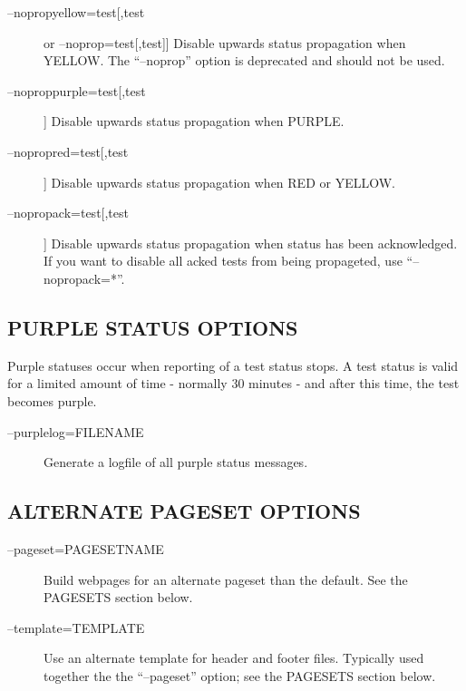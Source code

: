 \begin{description}

\item[--nopropyellow=test[,test] or --noprop=test[,test]] Disable
  upwards status propagation when YELLOW. The ``--noprop'' option is
  deprecated and should not be used. 
 

\item[--noproppurple=test[,test]] Disable upwards status propagation when PURPLE. 

 

\item[--nopropred=test[,test]] Disable upwards status propagation when RED or YELLOW. 

 

\item[--nopropack=test[,test]] Disable upwards status propagation when
  status has been acknowledged. If you want to disable all acked tests
  from being propageted, use ``--nopropack=*''. 


 


\end{description}

\subsection{PURPLE STATUS OPTIONS}
 Purple statuses occur when reporting of a test status stops. A test
 status is valid for a limited amount of time - normally 30 minutes -
 and after this time, the test becomes purple. 


 \begin{description}
\item[--purplelog=FILENAME] Generate a logfile of all purple status messages. 

 


\end{description}

\subsection{ALTERNATE PAGESET OPTIONS}


 \begin{description}
\item[--pageset=PAGESETNAME] Build webpages for an alternate pageset than the default. See the PAGESETS section below. 

 

\item[--template=TEMPLATE] Use an alternate template for header and
  footer files. Typically used together the the ``--pageset'' option;
  see the PAGESETS section below. 

\end{description}

